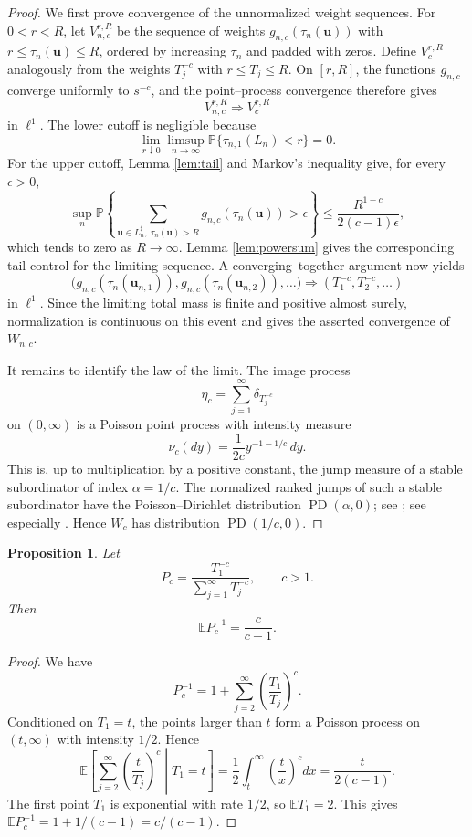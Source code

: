 \documentclass[a4paper,12pt]{article}
\newtheorem{prop}[thm]{Proposition}
\theoremstyle{definition}
\theoremstyle{remark}
\newcommand{\ex}{\mathbb E}
\newcommand{\pr}{\mathbb P}
\newcommand{\PD}{\operatorname{PD}}
\begin{document}
\begin{proof}
We first prove convergence of the unnormalized weight sequences.
For $0<r<R$, let $V_{n,c}^{r,R}$ be the sequence of weights
$g_{n,c}(\tau_n(\bm u))$ with $r\le \tau_n(\bm u)\le R$, ordered by increasing $\tau_n$ and padded with zeros.
Define $V_c^{r,R}$ analogously from the weights $T_j^{-c}$ with $r\le T_j\le R$.
On $[r,R]$, the functions $g_{n,c}$ converge uniformly to $s^{-c}$, and the point--process convergence therefore gives
$$
V_{n,c}^{r,R}\Rightarrow V_c^{r,R}
$$
in $\ell^1$.
The lower cutoff is negligible because
$$
\lim_{r\downarrow0}\limsup_{n\to\infty}
\pr\{\tau_{n,1}(L_n)<r\}=0.
$$
For the upper cutoff, Lemma \ref{lem:tail} and Markov's inequality give, for every $\epsilon>0$,
$$
\sup_n\pr\left\{
\sum_{\bm u\in L_n^\sharp,\ \tau_n(\bm u)>R}
 g_{n,c}(\tau_n(\bm u))>\epsilon
\right\}
\le
\frac{R^{1-c}}{2(c-1)\epsilon},
$$
which tends to zero as $R\to\infty$.
Lemma \ref{lem:powersum} gives the corresponding tail control for the limiting sequence.
A converging--together argument now yields
$$
\bigl(g_{n,c}(\tau_n(\bm u_{n,1})),
      g_{n,c}(\tau_n(\bm u_{n,2})),\ldots\bigr)
\Rightarrow
(T_1^{-c},T_2^{-c},\ldots)
$$
in $\ell^1$.
Since the limiting total mass is finite and positive almost surely, normalization is continuous on this event and gives the asserted convergence of $W_{n,c}$.

It remains to identify the law of the limit.
The image process
$$
\eta_c=\sum_{j=1}^{\infty}\delta_{T_j^{-c}}
$$
on $(0,\infty)$ is a Poisson point process with intensity measure
$$
\nu_c(dy)=\frac{1}{2c}y^{-1-1/c}\,dy.
$$
This is, up to multiplication by a positive constant, the jump measure of a stable subordinator of index $\alpha=1/c$.
The normalized ranked jumps of such a stable subordinator have the Poisson--Dirichlet distribution $\PD(\alpha,0)$; see \cite{Kingman75}; see especially \cite{PitmanYor97}.
Hence $W_c$ has distribution $\PD(1/c,0)$.
\end{proof}

\begin{prop}
\label{prop:cost}
Let
$$
P_c=\frac{T_1^{-c}}{\sum_{j=1}^{\infty}T_j^{-c}},
\qquad c>1.
$$
Then
$$
\ex P_c^{-1}=\frac{c}{c-1}.
$$
\end{prop}

\begin{proof}
We have
$$
P_c^{-1}=1+\sum_{j=2}^{\infty}\left(\frac{T_1}{T_j}\right)^c.
$$
Conditioned on $T_1=t$, the points larger than $t$ form a Poisson process on $(t,\infty)$ with intensity $1/2$.
Hence
$$
\ex\left[
\sum_{j=2}^{\infty}\left(\frac{t}{T_j}\right)^c
\middle|T_1=t\right]
=
\frac{1}{2}\int_t^\infty\left(\frac{t}{x}\right)^c dx
=
\frac{t}{2(c-1)}.
$$
The first point $T_1$ is exponential with rate $1/2$, so $\ex T_1=2$.
This gives $\ex P_c^{-1}=1+1/(c-1)=c/(c-1)$.
\end{proof}
\end{document}
